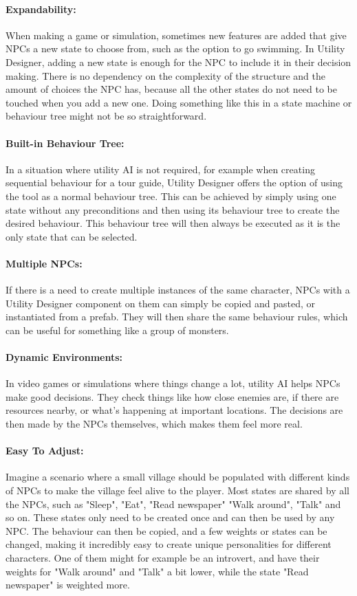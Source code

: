\paragraph{Expandability:}
When making a game or simulation, sometimes new features are added that give NPCs a new state to choose from, such as the option to go swimming. In Utility Designer, adding a new state is enough for the NPC to include it in their decision making. There is no dependency on the complexity of the structure and the amount of choices the NPC has, because all the other states do not need to be touched when you add a new one. Doing something like this in a state machine or behaviour tree might not be so straightforward.

\paragraph{Built-in Behaviour Tree:}
In a situation where utility AI is not required, for example when creating sequential behaviour for a tour guide, Utility Designer offers the option of using the tool as a normal behaviour tree. This can be achieved by simply using one state without any preconditions and then using its behaviour tree to create the desired behaviour. This behaviour tree will then always be executed as it is the only state that can be selected.

\paragraph{Multiple NPCs:}
If there is a need to create multiple instances of the same character, NPCs with a Utility Designer component on them can simply be copied and pasted, or instantiated from a prefab. They will then share the same behaviour rules, which can be useful for something like a group of monsters.

\paragraph{Dynamic Environments:}
In video games or simulations where things change a lot, utility AI helps NPCs make good decisions. They check things like how close enemies are, if there are resources nearby, or what's happening at important locations. The decisions are then made by the NPCs themselves, which makes them feel more real.

\paragraph{Easy To Adjust:}
Imagine a scenario where a small village should be populated with different kinds of NPCs to make the village feel alive to the player. Most states are shared by all the NPCs, such as "Sleep", "Eat", "Read newspaper" "Walk around", "Talk" and so on. These states only need to be created once and can then be used by any NPC. The behaviour can then be copied, and a few weights or states can be changed, making it incredibly easy to create unique personalities for different characters. One of them might for example be an introvert, and have their weights for "Walk around" and "Talk" a bit lower, while the state "Read newspaper" is weighted more.

